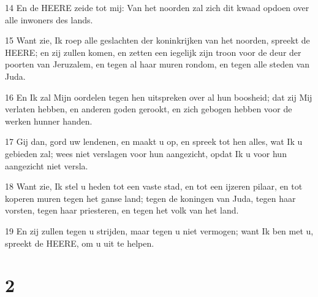 \par 14 En de HEERE zeide tot mij: Van het noorden zal zich dit kwaad opdoen over alle inwoners des lands.
\par 15 Want zie, Ik roep alle geslachten der koninkrijken van het noorden, spreekt de HEERE; en zij zullen komen, en zetten een iegelijk zijn troon voor de deur der poorten van Jeruzalem, en tegen al haar muren rondom, en tegen alle steden van Juda.
\par 16 En Ik zal Mijn oordelen tegen hen uitspreken over al hun boosheid; dat zij Mij verlaten hebben, en anderen goden gerookt, en zich gebogen hebben voor de werken hunner handen.
\par 17 Gij dan, gord uw lendenen, en maakt u op, en spreek tot hen alles, wat Ik u gebieden zal; wees niet verslagen voor hun aangezicht, opdat Ik u voor hun aangezicht niet versla.
\par 18 Want zie, Ik stel u heden tot een vaste stad, en tot een ijzeren pilaar, en tot koperen muren tegen het ganse land; tegen de koningen van Juda, tegen haar vorsten, tegen haar priesteren, en tegen het volk van het land.
\par 19 En zij zullen tegen u strijden, maar tegen u niet vermogen; want Ik ben met u, spreekt de HEERE, om u uit te helpen.

\chapter{2}

